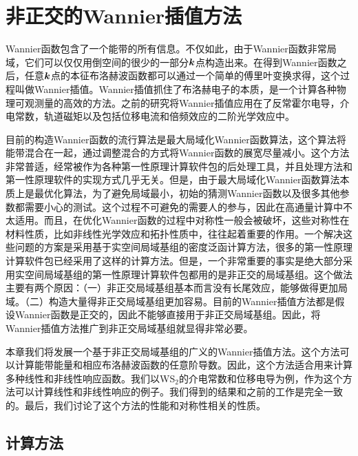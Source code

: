 \chapter{非正交的Wannier插值方法}

Wannier函数包含了一个能带的所有信息。不仅如此，由于Wannier函数非常局域，它们可以仅仅用倒空间的很少的一部分$\boldsymbol{k}$点构造出来\cite{souza_maximally-localized_2001,marzari_maximally_1997}。在得到Wannier函数之后，任意$\boldsymbol{k}$点的本征布洛赫波函数都可以通过一个简单的傅里叶变换求得，这个过程叫做Wannier插值\cite{marzari_maximally_2012}。Wannier插值抓住了布洛赫电子的本质，是一个计算各种物理可观测量的高效的方法。之前的研究将Wannier插值应用在了反常霍尔电导\cite{wang_textitab_2006}，介电常数\cite{yates_spectral_2007}，轨道磁矩\cite{lopez_wannier-based_2012}以及包括位移电流\cite{wang_first-principles_2017,ibanez-azpiroz_ab_2018}和倍频效应\cite{wang_first-principles_2017}的二阶光学效应中。


目前的构造Wannier函数的流行算法是最大局域化Wannier函数算法，这个算法将能带混合在一起，通过调整混合的方式将Wannier函数的展宽尽量减小\cite{marzari_maximally_2012}。这个方法非常普适，经常被作为各种第一性原理计算软件包的后处理工具\cite{mostofi_updated_2014}，并且处理方法和第一性原理软件的实现方式几乎无关。但是，由于最大局域化Wannier函数算法本质上是最优化算法，为了避免局域最小，初始的猜测Wannier函数以及很多其他参数都需要小心的测试。这个过程不可避免的需要人的参与，因此在高通量计算中不太适用。而且，在优化Wannier函数的过程中对称性一般会被破坏，这些对称性在材料性质，比如非线性光学效应和拓扑性质中，往往起着重要的作用。一个解决这些问题的方案是采用基于实空间局域基组的密度泛函计算方法，很多的第一性原理计算软件包已经采用了这样的计算方法。但是，一个非常重要的事实是绝大部分采用实空间局域基组的第一性原理计算软件包都用的是非正交的局域基组。这个做法主要有两个原因：（一）非正交局域基组基本而言没有长尾效应，能够做得更加局域。（二）构造大量得非正交局域基组更加容易。目前的Wannier插值方法都是假设Wannier函数是正交的，因此不能够直接用于非正交局域基组。因此，将Wannier插值方法推广到非正交局域基组就显得非常必要。

本章我们将发展一个基于非正交局域基组的广义的Wannier插值方法。这个方法可以计算能带能量和相应布洛赫波函数的任意阶导数。因此，这个方法适合用来计算多种线性和非线性响应函数。我们以WS$_2$的介电常数和位移电导为例，作为这个方法可以计算线性和非线性响应的例子。我们得到的结果和之前的工作是完全一致的。最后，我们讨论了这个方法的性能和对称性相关的性质。

\section{计算方法}\label{sec:method}

